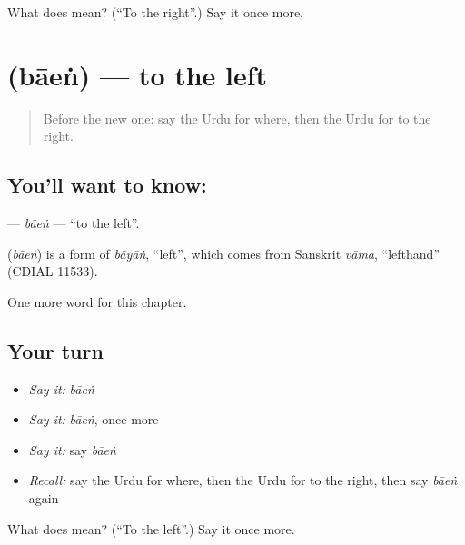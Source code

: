 \begin{tcolorbox}[breakable,colback=teal!4,colframe=teal!35!black,title={Before you move on}]
What does  mean? (\textquotedblleft{}To the right\textquotedblright{}.) Say it once more.
\end{tcolorbox}
\section[\texorpdfstring{\ur{بائیں} (bāeṅ)}{بائیں (bāeṅ)}]{ (bāeṅ) — to the left}

\label{lesson:UR-C96-baen}



\begin{quote}
Before the new one: say the Urdu for where, then the Urdu for to the right.
\end{quote}

\subsection*{You'll want to know: }
\textbf{} — \emph{bāeṅ} — \textquotedblleft{}to the left\textquotedblright{}.

\begin{cousinweb}
\textbf{} (\emph{bāeṅ}) is a form of \emph{bāyāṅ}, \textquotedblleft{}left\textquotedblright{}, which comes from Sanskrit \emph{vāma}, \textquotedblleft{}lefthand\textquotedblright{} (CDIAL 11533).
\end{cousinweb}

\begin{grammarlens}[title={What you've built}]
One more word for this chapter.
\end{grammarlens}

\subsection*{Your turn}
\begin{itemize}
\raggedright
  \item \emph{Say it:} \emph{bāeṅ}
  \item \emph{Say it:} \emph{bāeṅ}, once more
  \item \emph{Say it:} say \emph{bāeṅ}
  \item \emph{Recall:} say the Urdu for where, then the Urdu for to the right, then say \emph{bāeṅ} again
\end{itemize}

\begin{tcolorbox}[breakable,colback=teal!4,colframe=teal!35!black,title={Before you move on}]
What does  mean? (\textquotedblleft{}To the left\textquotedblright{}.) Say it once more.
\end{tcolorbox}
